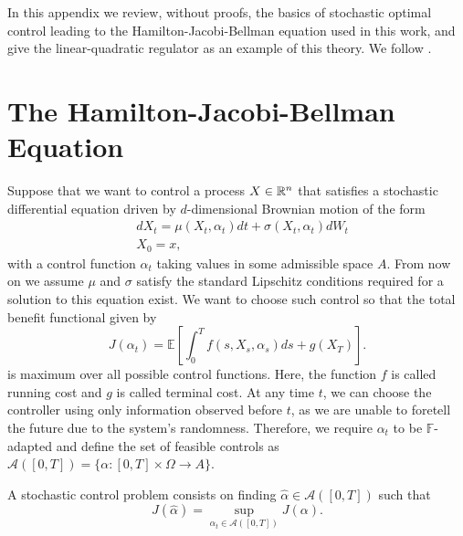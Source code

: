\label{chp:ApendixStochasticControl}
\newtheorem{thm}{Theorem}[chapter]%
In this appendix we review, without proofs, the basics of stochastic optimal control leading to the Hamilton-Jacobi-Bellman equation used in this work, and give the linear-quadratic regulator as an example of this theory. We follow \cite{pham_continuous-time_2009}.
\section*{The Hamilton-Jacobi-Bellman Equation}
Suppose that we want to control a process $X\in \mathbb{R}^n$ that satisfies a stochastic differential equation driven by $d$-dimensional Brownian motion of the form 
\begin{equation}
	\begin{split}
		&dX_t=\mu(X_t,\alpha_t)dt+\sigma(X_t,\alpha_t)dW_t\\
		&X_0=x,
	\end{split}
\end{equation} 
with a control function $\alpha_t$ taking values in some admissible space $A$. From now on we assume $\mu$ and $\sigma$ satisfy the standard Lipschitz conditions required for a solution to this equation exist. We want to choose such control so that the total benefit functional given by 
\begin{equation}
	J(\alpha_t)=\mathbb{E}\left[\int_{0}^{T}f(s,X_s,\alpha_s) ds +g(X_T)\right].
\end{equation}
is maximum over all possible control functions. Here, the function $f$ is called running cost and $g$ is called terminal cost. At any time $t$, we can choose the controller using only information observed before $t$, as we are unable to foretell the future due to the system's randomness. Therefore, we require $\alpha_t$ to be $\mathbb{F}$-adapted and define the set of feasible controls as $\mathcal{A}([0,T])=\{\alpha:[0,T]\times \Omega\to A\}$.

A stochastic control problem consists on finding $\hat{\alpha}\in \mathcal{A}([0,T])$ such that
\begin{equation}
	J(\hat{\alpha})=\sup_{\alpha_t\in\mathcal{A}([0,T])} J(\alpha).
\end{equation}

